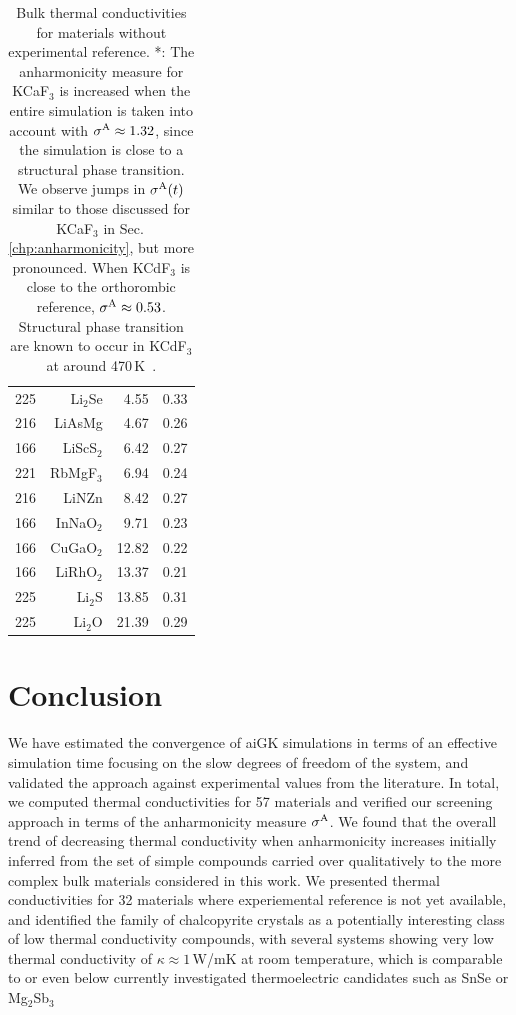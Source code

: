 \begin{table}[ht]
\begin{tabular}{rrrr}
         225 &    Li$_2$Se &                4.55 &       0.33 \\
         216 &      LiAsMg &                4.67 &       0.26 \\
         166 &   LiScS$_2$ &                6.42 &       0.27 \\
         221 &   RbMgF$_3$ &                6.94 &       0.24 \\
         216 &       LiNZn &                8.42 &       0.27 \\
         166 &   InNaO$_2$ &                9.71 &       0.23 \\
         166 &   CuGaO$_2$ &               12.82 &       0.22 \\
         166 &   LiRhO$_2$ &               13.37 &       0.21 \\
         225 &     Li$_2$S &               13.85 &       0.31 \\
         225 &     Li$_2$O &               21.39 &       0.29 \\
\bottomrule
\end{tabular}
  \caption{Bulk thermal conductivities for materials without experimental reference. *: The anharmonicity measure for KCaF$_3$ is increased when the entire simulation is taken into account with $\sigma^\mathrm{A} \approx 1.32$, since the simulation is close to a structural phase transition. We observe jumps in $\sigma^\mathrm{A} (t)$ similar to those discussed for KCaF$_3$ in Sec.\,\ref{chp:anharmonicity}, but more pronounced. When KCdF$_3$ is close to the orthorombic reference, $\sigma^\mathrm{A} \approx 0.53$. Structural phase transition are known to occur in KCdF$_3$ at around 470\,K~\cite{hidaka1977,hidaka1990}.}
  \label{tab:kappa.noexp}
\end{table}

\section{Conclusion}
We have estimated the convergence of aiGK simulations in terms of an effective simulation time focusing on the slow degrees of freedom of the system, and validated the approach against experimental values from the literature. In total, we computed thermal conductivities for  57 materials and verified our screening approach in terms of the anharmonicity measure $\sigma^\mathrm{A}$. We found that the overall trend of decreasing thermal conductivity when anharmonicity increases initially inferred from the set of simple compounds carried over qualitatively to the more complex bulk materials considered in this work. We presented thermal conductivities for  32 materials where experiemental reference is not yet available, and identified the family of chalcopyrite crystals as a potentially interesting class of low thermal conductivity compounds, with several systems showing very low thermal conductivity of $\kappa \approx 1$\,W/mK at room temperature, which is comparable to or even below currently investigated thermoelectric candidates such as SnSe or Mg$_2$Sb$_3$~\cite{zhao2014,wei2016,sassi2014,pan2020,kajikawa2003,condron2006,zhang2009,zhang2018,ding2021}
